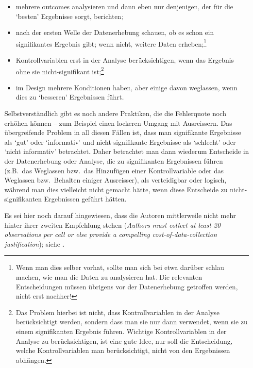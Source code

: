 \documentclass[oneside, 10pt]{book}\usepackage[]{graphicx}\usepackage[]{xcolor}
\begin{document}
\begin{itemize}
 \item mehrere outcomes analysieren und
 dann eben nur denjenigen, der für die `besten'
 Ergebnisse sorgt, berichten;
 
 \item nach der ersten Welle der Datenerhebung
 schauen, ob es schon ein signifikantes Ergebnis
 gibt; wenn nicht, weitere Daten erheben;\footnote{Wenn man dies selber vorhat, sollte man sich bei etwa \citet{Lakens2014} darüber schlau machen, wie man die Daten zu analysieren hat. Die relevanten Entscheidungen müssen übrigens vor der Datenerhebung getroffen werden, nicht erst nachher!}
 
 \item Kontrollvariablen erst in der Analyse berücksichtigen,
 wenn das Ergebnis ohne sie nicht-signifikant ist;\footnote{Das Problem hierbei ist nicht, dass Kontrollvariablen in der Analyse
 berücksichtigt werden, sondern dass man sie nur dann verwendet, wenn sie zu einem signifikanten Ergebnis führen. Wichtige Kontrollvariablen
 in der Analyse zu berücksichtigen, ist eine gute Idee, nur soll die Entscheidung, welche Kontrollvariablen man berücksichtigt, nicht von
 den Ergebnissen abhängen.}
 
 \item im Design mehrere Konditionen haben, aber einige davon weglassen,
 wenn dies zu `besseren' Ergebnissen führt.
\end{itemize}

Selbstverständlich gibt es noch andere Praktiken, die die Fehlerquote
noch erhöhen können -- zum Beispiel einen lockeren Umgang mit Ausreissern.
Das übergreifende Problem in all diesen Fällen ist,
dass man signifikante Ergebnisse als `gut' oder `informativ'
und nicht-signifikante Ergebnisse als `schlecht' oder `nicht informativ' betrachtet.
Daher betrachtet man dann wiederum Entscheide in der Datenerhebung oder Analyse, die zu signifikanten
Ergebnissen führen (z.B.\ das Weglassen bzw.\ das Hinzufügen einer
Kontrollvariable oder das Weglassen bzw.\ Behalten einiger Ausreisser),
als verteidigbar oder logisch, während man dies vielleicht nicht gemacht hätte,
wenn diese Entscheide zu nicht-signifikanten Ergebnissen geführt hätten.

Es sei hier noch darauf hingewiesen, dass
die Autoren mittlerweile nicht mehr hinter
ihrer zweiten Empfehlung stehen (\textit{Authors must
collect at least 20 observations per cell or else provide a
compelling cost-of-data-collection justification});
siehe \citet{Simmons2018}.
\end{document}
